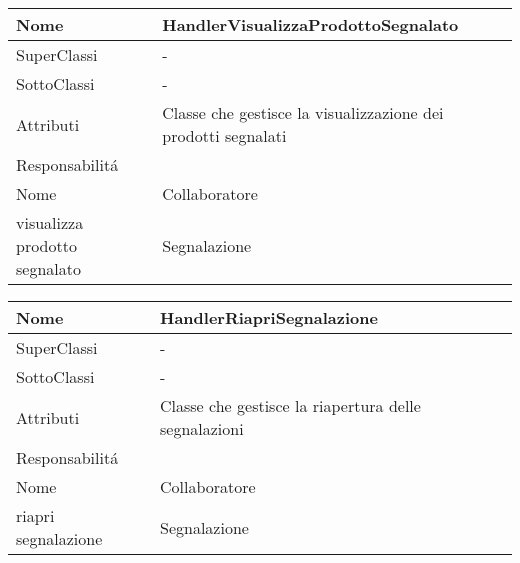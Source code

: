 \begin{center}
    \begin{tabular}{ |p{3cm}|p{3cm}|p{3cm}|p{3cm}| }
        \hline
        Nome & \multicolumn{3}{|p{9cm}|}{HandlerVisualizzaProdottoSegnalato} \\\hline
        SuperClassi & \multicolumn{3}{|p{9cm}|}{-} \\\hline
        SottoClassi & \multicolumn{3}{|p{9cm}|}{-} \\\hline
        Attributi & \multicolumn{3}{|p{9cm}|}{Classe che gestisce la visualizzazione dei prodotti segnalati} \\\hline
        \multicolumn{4}{|p{12cm}|}{Responsabilit\'a} \\\hline
        \multicolumn{2}{|p{6cm}|}{Nome} & \multicolumn{2}{|p{6cm}|}{Collaboratore} \\\hline
        \multicolumn{2}{|p{6cm}|}{visualizza prodotto segnalato} & \multicolumn{2}{|p{6cm}|}{Segnalazione} \\\hline
    \end{tabular}
\end{center}

\begin{center}
    \begin{tabular}{ |p{3cm}|p{3cm}|p{3cm}|p{3cm}| }
        \hline
        Nome & \multicolumn{3}{|p{9cm}|}{HandlerRiapriSegnalazione} \\\hline
        SuperClassi & \multicolumn{3}{|p{9cm}|}{-} \\\hline
        SottoClassi & \multicolumn{3}{|p{9cm}|}{-} \\\hline
        Attributi & \multicolumn{3}{|p{9cm}|}{Classe che gestisce la riapertura delle segnalazioni} \\\hline
        \multicolumn{4}{|p{12cm}|}{Responsabilit\'a} \\\hline
        \multicolumn{2}{|p{6cm}|}{Nome} & \multicolumn{2}{|p{6cm}|}{Collaboratore} \\\hline
        \multicolumn{2}{|p{6cm}|}{riapri segnalazione} & \multicolumn{2}{|p{6cm}|}{Segnalazione} \\\hline
    \end{tabular}
\end{center}

